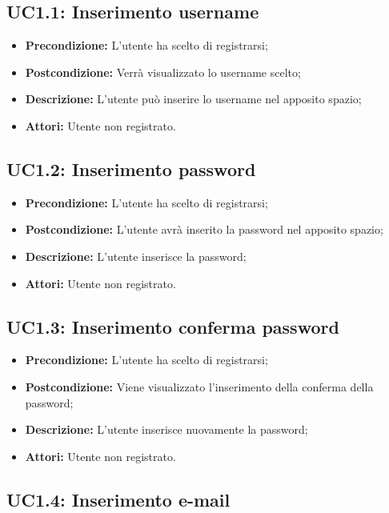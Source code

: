 \subsection{ UC1.1: Inserimento username}

\begin{itemize}
	\item \textbf{Precondizione:} L'utente ha scelto di registrarsi;
	\item \textbf{Postcondizione:} Verrà visualizzato lo username scelto;
	\item \textbf{Descrizione:} L'utente può inserire lo username nel apposito spazio;
	\item \textbf{Attori:} Utente non registrato.
\end{itemize}
\subsection{ UC1.2: Inserimento password}

\begin{itemize}
	\item \textbf{Precondizione:} L'utente ha scelto di registrarsi;
	\item \textbf{Postcondizione:} L'utente avrà inserito la password nel apposito spazio;
	\item \textbf{Descrizione:} L'utente inserisce la password;
	\item \textbf{Attori:} Utente non registrato.
\end{itemize}
\subsection{ UC1.3: Inserimento conferma password}

\begin{itemize}
	\item \textbf{Precondizione:} L'utente ha scelto di registrarsi;
	\item \textbf{Postcondizione:} Viene visualizzato l'inserimento della conferma della password;
	\item \textbf{Descrizione:} L'utente inserisce nuovamente la password;
	\item \textbf{Attori:} Utente non registrato.
\end{itemize}
\subsection{ UC1.4: Inserimento e-mail}

